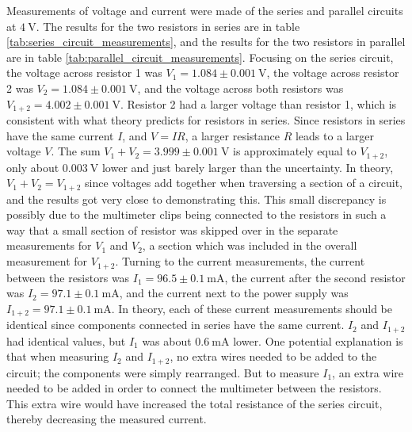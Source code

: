 \documentclass[12pt]{iopart} %
\gdef\units#1{~\mathrm{#1}}
\begin{document}
Measurements of voltage and current were made of the series and parallel circuits at $4 \units{V}$.
The results for the two resistors in series are in table \ref{tab:series_circuit_measurements}, and the results for the two resistors in parallel are in table \ref{tab:parallel_circuit_measurements}.
Focusing on the series circuit, the voltage across resistor 1 was $V_1 = 1.084 \pm 0.001 \units{V}$, the voltage across resistor 2 was $V_2 = 1.084 \pm 0.001 \units{V}$, and the voltage across both resistors was $V_{1+2} = 4.002 \pm 0.001 \units{V}$.
Resistor 2 had a larger voltage than resistor 1, which is consistent with what theory predicts for resistors in series.
Since resistors in series have the same current $I$, and $V = IR$, a larger resistance $R$ leads to a larger voltage $V$.
The sum $V_1 + V_2 = 3.999 \pm 0.001 \units{V}$ is approximately equal to $V_{1+2}$, only about $0.003 \units{V}$ lower and just barely larger than the uncertainty.
In theory, $V_1 + V_2 = V_{1+2}$ since voltages add together when traversing a section of a circuit, and the results got very close to demonstrating this.
This small discrepancy is possibly due to the multimeter clips being connected to the resistors in such a way that a small section of resistor was skipped over in the separate measurements for $V_1$ and $V_2$, a section which was included in the overall measurement for $V_{1+2}$.
Turning to the current measurements, the current between the resistors was $I_1 = 96.5 \pm 0.1 \units{mA}$, the current after the second resistor was $I_2 = 97.1 \pm 0.1 \units{mA}$, and the current next to the power supply was $I_{1+2} = 97.1 \pm 0.1 \units{mA}$.
In theory, each of these current measurements should be identical since components connected in series have the same current.
$I_2$ and $I_{1+2}$ had identical values, but $I_1$ was about $0.6 \units{mA}$ lower.
One potential explanation is that when measuring $I_2$ and $I_{1+2}$, no extra wires needed to be added to the circuit; the components were simply rearranged.
But to measure $I_1$, an extra wire needed to be added in order to connect the multimeter between the resistors.
This extra wire would have increased the total resistance of the series circuit, thereby decreasing the measured current.
\end{document}
